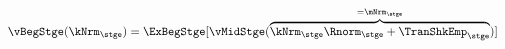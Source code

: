   \begin{equation}\begin{gathered}\begin{aligned}
\vBegStge(\kNrm_{\stge}) & = \ExBegStge[\vMidStge(\overbrace{\kNrm_{\stge} \Rnorm_{\stge} + \TranShkEmp_{\stge}}^{=\mNrm_{\stge}})]  \label{eq:vBegStge}
      \end{aligned}\end{gathered}\end{equation}
